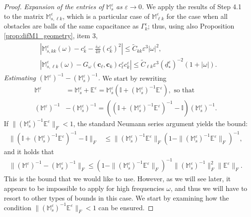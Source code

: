 \documentclass[]{article}
\numberwithin{equation}{section}
\numberwithin{theorem}{section}
\numberwithin{lemma}{section}
\numberwithin{corollary}{section}
\numberwithin{proposition}{section}
\numberwithin{definition}{section}
\newcommand{\mypar}[1]{\noindent\textit{#1}\hspace{0.1em}}
\newcommand{\bc}{\boldsymbol{c}}
\newcommand{\re}{\varepsilon}
\begin{document}
\begin{proof}
		\mypar{Expansion of the entries of $\mathbb{M}^{\re}_{s}$ as $\varepsilon\rightarrow 0$.} We  apply the results of Step 4.1 to the matrix $\mathbb{M}^{\re}_{s, \ell k}$, which is a particular case of $\mathbb{M}^{\re}_{\ell k}$ for the case when all obstacles are balls of the same capacitance as $\Gamma^{\re}_k$; thus, using also Proposition \ref{prop:difM1_geometry}, item 3, 
		\begin{align}
			\label{eq:dev_entries}
			\begin{split}
				&	|\mathbb{M}^{\re}_{s, kk}(\omega)-c_k^{\varepsilon}-\frac{i\omega}{4\pi}(c_k^{\varepsilon})^2|\leq \widetilde{C}_{kk} \varepsilon^3|\omega|^2,\\
				&	|\mathbb{M}^{\re}_{s, \ell k}(\omega)-G_{\omega}(\bc_{\ell}, \bc_{k})c^{\re}_{\ell} c^{\re}_k | \leq \widetilde{C}_{\ell k} \varepsilon^3 ({\underline{d}}^{\re}_*)^{-2} (1+|\omega|).
			\end{split}
		\end{align}
		\mypar{Estimating $(\mathbb{M}^{\varepsilon})^{-1}-(\mathbb{M}^{\re}_{s})^{-1}$.} We start by rewriting 
		\begin{align*}%
			\mathbb{M}^{\re}&=\mathbb{{M}}^{\re}_s+\mathbb{E}^{\re}=\mathbb{M}^{\re}_s\left(\mathbb{I}+(\mathbb{M}^{\re}_{s})^{-1}\mathbb{E}^{\re}\right), \text{ so that }\\
			(\mathbb{M}^{\re})^{-1}&-(\mathbb{M}^{\re}_s)^{-1}=\left( \left(\mathbb{I}+(\mathbb{M}^{\re}_{s})^{-1}\mathbb{E}^{\re}\right)^{-1}-\mathbb{I}\right)(\mathbb{M}^{\re}_{s})^{-1}.
		\end{align*}
		If $\|(\mathbb{M}^{\re}_{s})^{-1}\mathbb{E}^{\re}\|_F<1$, the standard Neumann series argument yields the bound:
		\begin{align*}%
			\|  \left(\mathbb{I}+(\mathbb{M}^{\re}_{s})^{-1}\mathbb{E}^{\re}\right)^{-1}-\mathbb{I} \|_F  %
			&\leq \| (\mathbb{M}^{\re}_{s})^{-1}\mathbb{E}^{\re} \|_F (1 - \| (\mathbb{M}^{\re}_{s})^{-1}\mathbb{E}^{\re} \|_F)^{-1},
		\end{align*}
		and it holds that 
		\begin{align}
			\label{eq:MtildeM}
			\|(\mathbb{M}^{\re})^{-1}-\left(\mathbb{M}^{\re}_s\right)^{-1}\|_F\leq (1-\|(\mathbb{M}^{\re}_{s})^{-1}\mathbb{E}^{\re}\|_F)^{-1}	\|(\mathbb{M}^{\re}_{s})^{-1}\|^2_F\|\mathbb{E}^{\re}\|_F.
		\end{align}
		This is the bound that we would like to use. However, as we will see later, it appears to be impossible to apply for high frequencies $\omega$, and thus we will have to resort to other types of bounds in this case. We start by examining how the condition $\|(\mathbb{M}^{\re}_{s})^{-1}\mathbb{E}^{\re}\|_F<1$ can be ensured. 
		

\end{proof}
\end{document}
